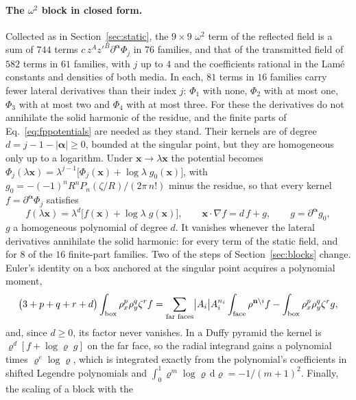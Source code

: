 \documentclass[11pt,a4paper]{article}
\newcommand{\balpha}{\boldsymbol{\alpha}}
\newcommand{\dd}{\mathrm{d}}
\begin{document}
\paragraph{The $\omega^2$ block in closed form.} Collected as in Section~\ref{sec:static}, the $9\times9$
$\omega^2$ term of the reflected field is a sum of $744$ terms $c\,z^Az'^B\partial^{\balpha}\Phi_j$ in $76$
families, and that of the transmitted field of $582$ terms in $61$ families, with $j$ up to $4$ and the
coefficients rational in the Lam\'e constants and densities of both media. In each, $81$ terms in $16$ families
carry fewer lateral derivatives than their index $j$: $\Phi_1$ with none, $\Phi_2$ with at most one,
$\Phi_3$ with at most two and $\Phi_4$ with at most three. For these the derivatives do not annihilate the
solid harmonic of the residue, and the finite parts of Eq.~\eqref{eq:fppotentials} are needed as they stand.
Their kernels are of degree $d=j-1-|\balpha|\ge0$, bounded at the singular point, but they are homogeneous
only up to a logarithm. Under $\mathbf x\to\lambda\mathbf x$ the potential becomes
$\Phi_j(\lambda\mathbf x)=\lambda^{j-1}\bigl[\Phi_j(\mathbf x)+\log\lambda\;g_0(\mathbf x)\bigr]$, with
$g_0=-(-1)^nR^nP_n(\zeta/R)/(2\pi\,n!)$ minus the residue, so that every kernel $f=\partial^{\balpha}\Phi_j$
satisfies
\begin{equation}\label{eq:loghomogeneous}
  f(\lambda\mathbf x)=\lambda^{d}\bigl[f(\mathbf x)+\log\lambda\;g(\mathbf x)\bigr],\qquad
  \mathbf x\cdot\nabla f=d\,f+g,\qquad g=\partial^{\balpha}g_0,
\end{equation}
$g$ a homogeneous polynomial of degree $d$. It vanishes whenever the lateral derivatives annihilate the solid
harmonic: for every term of the static field, and for $8$ of the $16$ finite-part families. Two of the steps
of Section~\ref{sec:blocks} change. Euler's identity on a box anchored at the singular point acquires a
polynomial moment,
\begin{equation}\label{eq:eulerlog}
  \bigl(3+p+q+r+d\bigr)\int_{\rm box}\rho_x^p\rho_y^q\zeta^r f
  =\sum_{\text{far faces}}\bigl|A_i\bigr|A_i^{n_i}\int_{\rm face}\rho^{\mathbf n\setminus i}f
  -\int_{\rm box}\rho_x^p\rho_y^q\zeta^r g,
\end{equation}
and, since $d\ge0$, its factor never vanishes. In a Duffy pyramid the kernel is
$\varrho^d[f+\log\varrho\;g]$ on the far face, so the radial integrand gains a polynomial times
$\varrho^e\log\varrho$, which is integrated exactly from the polynomial's coefficients in shifted Legendre
polynomials and $\int_0^1\varrho^m\log\varrho\,\dd\varrho=-1/(m+1)^2$. Finally, the scaling of a block with the
\end{document}
